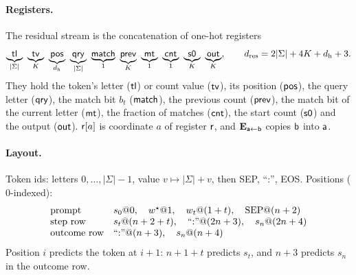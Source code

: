 \paragraph{Registers.} The residual stream is the concatenation of one-hot registers
\[
 \underbrace{\reg{tl}}_{|\Sigma|}\ \underbrace{\reg{tv}}_{K}\ \underbrace{\reg{pos}}_{d_{\mathrm h}}\ \underbrace{\reg{qry}}_{|\Sigma|}\ \underbrace{\reg{match}}_{1}\
 \underbrace{\reg{prev}}_{K}\ \underbrace{\reg{mt}}_{1}\ \underbrace{\reg{cnt}}_{1}\ \underbrace{\reg{s0}}_{K}\ \underbrace{\reg{out}}_{K},
 \qquad d_{\mathrm{res}}=2|\Sigma|+4K+d_{\mathrm h}+3 .
\]
They hold the token's letter ($\mathsf{tl}$) or count value ($\mathsf{tv}$), its position ($\mathsf{pos}$), the query letter ($\mathsf{qry}$), the match
bit $b_t$ ($\mathsf{match}$), the previous count ($\mathsf{prev}$), the match bit of the current letter ($\mathsf{mt}$), the fraction of matches
($\mathsf{cnt}$), the start count ($\mathsf{s0}$) and the output ($\mathsf{out}$).
$\mathsf{r}[a]$ is coordinate $a$ of register $\mathsf{r}$, and $\mathbf E_{\mathsf{a}\leftarrow\mathsf{b}}$ copies $\mathsf{b}$ into $\mathsf{a}$.

\paragraph{Layout.} Token ids: letters $0,\ldots,|\Sigma|-1$, value $v\mapsto|\Sigma|+v$, then SEP, ``:'', EOS. Positions ($0$-indexed):
\[
\begin{array}{ll}
 \text{prompt} & s_0@0,\quad w^\star@1,\quad w_t@(1+t),\quad \mathrm{SEP}@(n+2)\\
 \text{step row} & s_t@(n+2+t),\quad ``{:}"@(2n+3),\quad s_n@(2n+4)\\
 \text{outcome row} & ``{:}"@(n+3),\quad s_n@(n+4)
\end{array}
\]
Position $i$ predicts the token at $i+1$: $n+1+t$ predicts $s_t$, and $n+3$ predicts $s_n$ in the outcome row.

